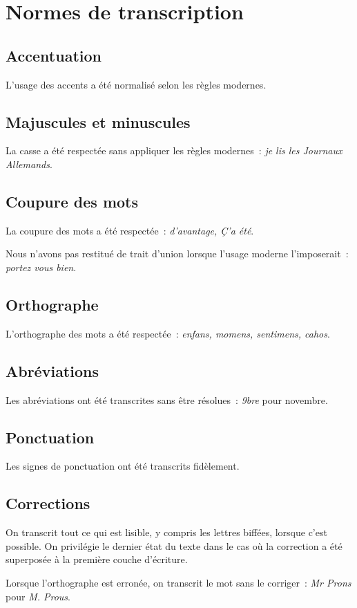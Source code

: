 \documentclass[a4paper,12pt,twoside]{book}
\begin{document}
	\chapter{Normes de transcription}
	
		\section{Accentuation}
		L'usage des accents a été normalisé selon les règles modernes.
		
		\section{Majuscules et minuscules}
		La casse a été respectée sans appliquer les règles modernes~: \textit{je lis les Journaux Allemands}.
		
		\section{Coupure des mots}
		La coupure des mots a été respectée~: \textit{d'avantage, Ç'a été}.
		
		Nous n'avons pas restitué de trait d'union lorsque l'usage moderne l'imposerait~: \textit{portez vous bien}.
				
		\section{Orthographe}
		L'orthographe des mots a été respectée~: \textit{enfans, momens, sentimens, cahos}.
		
		\section{Abréviations}
		Les abréviations ont été transcrites sans être résolues~: \textit{9bre} pour novembre.

		\section{Ponctuation}
		Les signes de ponctuation ont été transcrits fidèlement.
		
		\section{Corrections}
		On transcrit tout ce qui est lisible, y compris les lettres biffées, lorsque c'est possible. On privilégie le dernier état du texte dans le cas où la correction a été superposée à la première couche d'écriture.
		
		Lorsque l'orthographe est erronée, on transcrit le mot sans le corriger~: \textit{Mr Prons} pour \textit{M. Prous}.
           	
\end{document}
